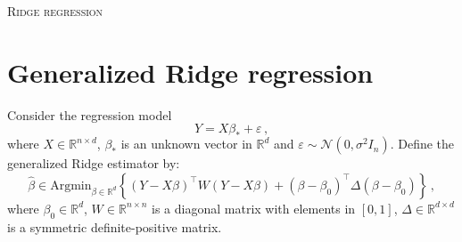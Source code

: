 \documentclass[a4paper,10pt,fleqn]{article}
\newcommand{\rset}{\ensuremath{\mathbb{R}}}
\newcommand{\1}{\ensuremath{\mathbbm{1}}}
\begin{document}

\noindent\hrulefill

\begin{center}
\textsc{Ridge regression}
\end{center}
\hrulefill

\medskip


\section*{Generalized Ridge regression}
Consider the regression model
$$
Y = X\beta_* + \varepsilon\,,
$$
where $X\in\mathbb{R}^{n\times d}$, $\beta_*$ is an unknown vector in $\mathbb{R}^{d}$ and $\varepsilon\sim \mathcal{N}(0,\sigma^2 I_n)$.
Define the generalized Ridge estimator by:
$$
\widehat{\beta} \in \mathrm{Argmin}_{\beta\in \mathbb{R}^{d}} \left\{(Y -X\beta)^\top W (Y-X\beta) + (\beta-\beta_0)^\top \Delta (\beta-\beta_0)\right\}\,,
$$
where $\beta_0 \in \mathbb{R}^{d}$, $W\in\rset^{n\times n}$ is a diagonal matrix with elements in $[0,1]$, $\Delta\in\rset^{d\times d}$ is a symmetric definite-positive matrix.
\end{document}
